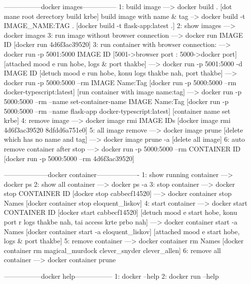 -----------------docker images---------------
1: build image ---> docker build . [dot mane root derectory build krbe]
    build image with name & tag --> docker build -t IMAGE_NAME:TAG . [docker build -t flask-app:latest .]
2: show images ---> docker images
3: run image without browser connection ---> docker run IMAGE ID [docker run 4d6f3ac39520]
3: run container with browser connection:
---> docker run -p 5001:5000 IMAGE ID [5001->browser port : 5000->docker port] [attached mood e run hobe, logs & port thakbe]
---> docker run -p 5001:5000 -d IMAGE ID [detuch mood e run hobe, konu logs thakbe nah, port thakbe]
---> docker run -p 5000:5000 --rm IMAGE Name:Tag [docker run -p 5000:5000 --rm docker-typescript:latest] [run container with image name:tag]
---> docker run -p 5000:5000 --rm --name set-container-name IMAGE Name:Tag [docker run -p 5000:5000 --rm --name flask-app docker-typescript:latest] [container name set krbe]
4: remove image ---> docker image rmi IMAGE IDs [docker image rmi 4d6f3ac39520 8dfdd6a751e0]
5: all image remove 
---> docker image prune [delete which has no name and tag]
---> docker image prune -a [delete all image]
6: auto remove container after stop 
---> docker run -p 5000:5000 --rm CONTAINER ID [docker run -p 5000:5000 --rm 4d6f3ac39520]



--------------------docker container-------------------
1: show running container ---> docker ps
2: show all container ---> docker ps -a
3: stop container 
---> docker stop CONTAINER ID [docker stop cabbecf14520]
---> docker container stop Names [docker container stop eloquent_liskov]
4: start container 
---> docker start CONTAINER ID [docker start cabbecf14520] [detuch mood e start hobe, konu port r logs thakbe nah, tai access krte prbo nah]
---> docker container start -a Names [docker container start -a eloquent_liskov] [attached mood e start hobe, logs & port thakbe]
5: remove container 
---> docker container rm Names [docker container rm magical_murdock clever_snyder clever_allen]
6: remove all container
---> docker container prune

-----------------docker help-----------------
1: docker --help
2: docker run --help